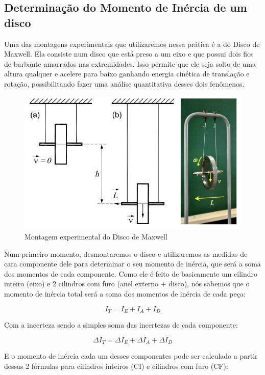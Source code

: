 \subsection{Determinação do Momento de Inércia de um disco}

Uma das montagens experimentais que utilizaremos nessa prática é a do Disco de Maxwell. Ela consiste num disco que está preso a um eixo e que possui dois fios de barbante amarrados nas extremidades. Isso permite que ele seja solto de uma altura qualquer e acelere para baixo ganhando energia cinética de translação e rotação, possibilitando fazer uma análise quantitativa desses dois fenômenos. 

\begin{figure}[H]
  \centering
  \includegraphics[scale=0.5]{images/setup-maxwell.png}
  \caption{Montagem experimental do Disco de Maxwell}
\end{figure}

Num primeiro momento, desmontaremos o disco e utilizaremos as medidas de cara componente dele para determinar o seu momento de inércia, que será a soma dos momentos de cada componente. Como ele é feito de basicamente um cilindro inteiro (eixo) e 2 cilindros com furo (anel externo + disco), nós sabemos que o momento de inércia total será a soma dos momentos de inércia de cada peça:

\[I_T = I_E + I_A + I_D\]

Com a incerteza sendo a simples soma das incertezas de cada componente:

\[\Delta I_T = \Delta I_E + \Delta I_A + \Delta I_D\]

E o momento de inércia cada um desses componentes pode ser calculado a partir dessas 2 fórmulas para cilindros inteiros (CI) e cilindros com furo (CF):

